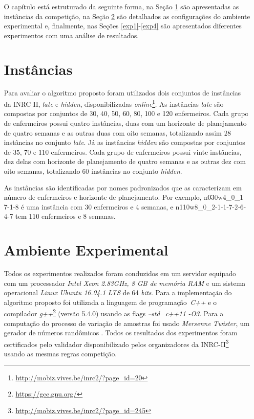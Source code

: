\documentclass[cic,tc, twoside]{iiufrgs}
\begin{document}
O capítulo está estruturado da seguinte forma, na Seção \ref{instancia} são apresentadas as instâncias da competição, na Seção \ref{confParam} são detalhados as configurações do ambiente experimental e, finalmente, nas Seções \ref{exp1}-\ref{exp4} são apresentados diferentes experimentos com uma análise de resultados.

\section{Instâncias}\label{instancia}

Para avaliar o algoritmo proposto foram utilizados dois conjuntos de instâncias da INRC-II, \textit{late} e \textit{hidden}, disponibilizadas \textit{online}\footnote{\url{http://mobiz.vives.be/inrc2/?page_id=20}}. 
As instâncias \textit{late} são compostas por conjuntos de 30, 40, 50, 60, 80, 100 e 120 enfermeiros. Cada grupo de enfermeiros possui quatro instâncias, duas com um horizonte de planejamento de quatro semanas e as outras duas com oito semanas, totalizando assim 28 instâncias no conjunto \textit{late}.
Já as instâncias \textit{hidden} são compostas por conjuntos de 35, 70 e 110 enfermeiros. Cada grupo de enfermeiros possui vinte
instâncias, dez delas com horizonte de planejamento de quatro semanas e as outras dez com oito semanas, totalizando 60 instâncias no conjunto \textit{hidden}.

As instâncias são identificadas por nomes padronizados que as caracterizam em número de enfermeiros e horizonte de planejamento. Por exemplo, n030w4\_0\_1-7-1-8 é uma instância com 30 enfermeiros e 4 semanas, e n110w8\_0\_2-1-1-7-2-6-4-7 tem 110 enfermeiros e 8 semanas.

\section{Ambiente Experimental}\label{confParam}

Todos os experimentos realizados foram conduzidos em um servidor equipado com um processador \textit{Intel Xeon 2.83GHz, 8 GB de memória RAM} e um sistema operacional \textit{Linux Ubuntu 16.04.1 LTS} de 64 \textit{bits}. 
Para a implementação do algoritmo proposto foi utilizada a linguagem de programação~\textit{C++} e o compilador \textit{g++}\footnote{\url{https://gcc.gnu.org/}} (versão 5.4.0) usando as flags \textit{--std=c++11 -O3}. 
Para a computação do processo de variação de amostras foi usado \emph{Mersenne Twister}, um gerador de números randômicos \cite{mersenne}.
Todos os resultados dos experimentos foram certificados pelo validador disponibilizado pelos organizadores da INRC-II\footnote{\url{http://mobiz.vives.be/inrc2/?page_id=245}\label{site}} usando as mesmas regras competição.
\end{document}
